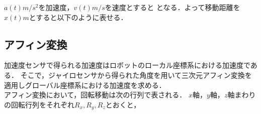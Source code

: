 \documentclass[11pt,a4]{jsarticle}
\begin{document}
    $a(t)\unit{m/s^2}$を加速度，$v(t)\unit{m/s}$を速度とすると
    となる．よって移動距離を$x(t)\unit{m}$とすると以下のように表せる．

  \subsection{アフィン変換}
     加速度センサで得られる加速度はロボットのローカル座標系における加速度である．
     そこで，ジャイロセンサから得られた角度を用いて三次元アフィン変換を適用しグローバル座標系における加速度を求める．\\
     アフィン変換において，回転移動は次の行列で表される．
     $x$軸，$y$軸，$z$軸まわりの回転行列をそれぞれ$R_x, R_y, R_z$とおくと，
\end{document}
